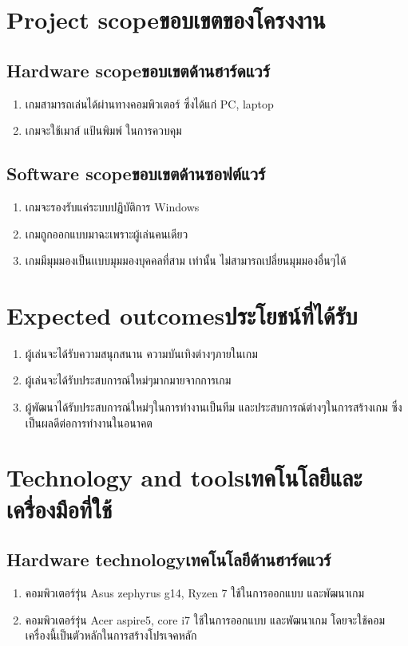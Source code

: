 \section{\ifenglish Project scope\else ขอบเขตของโครงงาน\fi}

\subsection{\ifenglish Hardware scope\else ขอบเขตด้านฮาร์ดแวร์\fi}
\begin{enumerate}
    \item เกมสามารถเล่นได้ผ่านทางคอมพิวเตอร์ ซึ่งได้แก่ PC, laptop
    \item เกมจะใช้เมาส์ แป้นพิมพ์ ในการควบคุม
\end{enumerate}
\subsection{\ifenglish Software scope\else ขอบเขตด้านซอฟต์แวร์\fi}
\begin{enumerate}
    \item เกมจะรองรับแค่ระบบปฏิบัติการ Windows
    \item เกมถูกออกแบบมาฉะเพราะผู้เล่นคนเดียว
    \item เกมมีมุมมองเป็นเเบบมุมมองบุคคลที่สาม เท่านั้น ไม่สามารถเปลี่ยนมุมมองอื่นๆได้
\end{enumerate}
\section{\ifenglish Expected outcomes\else ประโยชน์ที่ได้รับ\fi}
\begin{enumerate}
    \item ผู้เล่นจะได้รับความสนุกสนาน ความบันเทิงต่างๆภายในเกม
    \item ผู้เล่นจะได้รับประสบการณ์ใหม่ๆมากมายจากการเกม
    \item ผู้พัฒนาได้รับประสบการณ์ใหม่ๆในการทำงานเป็นทีม และประสบการณ์ต่างๆในการสร้างเกม ซึ่งเป็นผลดีต่อการทำงานในอนาคต
\end{enumerate}
\section{\ifenglish Technology and tools\else เทคโนโลยีและเครื่องมือที่ใช้\fi}

\subsection{\ifenglish Hardware technology\else เทคโนโลยีด้านฮาร์ดแวร์\fi}
\begin{enumerate}
    \item คอมพิวเตอร์รุ่น Asus zephyrus g14, Ryzen 7 ใช้ในการออกแบบ และพัฒนาเกม
    \item คอมพิวเตอร์รุ่น Acer aspire5, core i7 ใช้ในการออกแบบ และพัฒนาเกม โดยจะใช้คอมเครื่องนี้เป็นตัวหลักในการสร้างโปรเจคหลัก
\end{enumerate}
